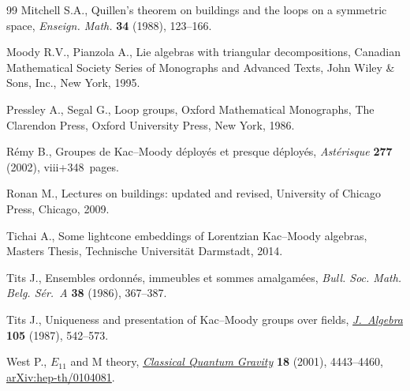 \documentclass[11pt]{article}
\numberwithin{equation}{section}
\numberwithin{equation}{section}
\begin{document}
\begin{thebibliography}{99}
Mitchell S.A., Quillen's theorem on buildings and the loops on a symmetric
 space, \textit{Enseign. Math.} \textbf{34} (1988), 123--166.

Moody R.V., Pianzola A., Lie algebras with triangular decompositions, Canadian
 Mathematical Society Series of Monographs and Advanced Texts, John Wiley \&
 Sons, Inc., New York, 1995.

Pressley A., Segal G., Loop groups, Oxford Mathematical Monographs, The
 Clarendon Press, Oxford University Press, New York, 1986.

R\'emy B., Groupes de {K}ac--{M}oody d\'eploy\'es et presque d\'eploy\'es, \textit{Ast\'erisque} \textbf{277} (2002), viii+348~pages.

Ronan M., Lectures on buildings: updated and revised, University of Chicago Press, Chicago, 2009.

Tichai A., Some lightcone embeddings of {L}orentzian {K}ac--{M}oody algebras,
 {M}asters Thesis, {T}echnische {U}niversit\"at {D}armstadt, 2014.

Tits J., Ensembles ordonn\'es, immeubles et sommes amalgam\'ees,
 \textit{Bull. Soc. Math. Belg. S\'er.~A} \textbf{38} (1986), 367--387.

Tits J., Uniqueness and presentation of {K}ac--{M}oody groups over fields,
 \href{https://doi.org/10.1016/0021-8693(87)90214-6}{\textit{J.~Algebra}} \textbf{105} (1987), 542--573.

West P., {$E_{11}$} and {M} theory, \href{https://doi.org/10.1088/0264-9381/18/21/305}{\textit{Classical Quantum Gravity}}
 \textbf{18} (2001), 4443--4460, \href{https://arxiv.org/abs/hep-th/0104081}{arXiv:hep-th/0104081}.

\end{thebibliography}
\end{document}
